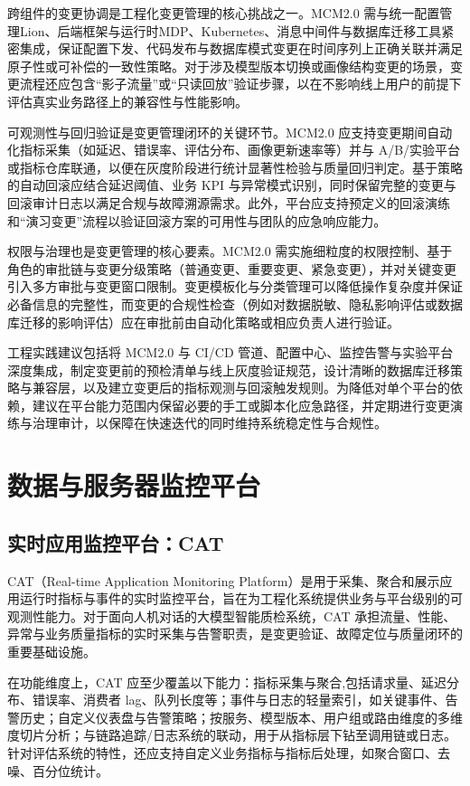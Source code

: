 跨组件的变更协调是工程化变更管理的核心挑战之一。MCM2.0 需与统一配置管理Lion、后端框架与运行时MDP、Kubernetes、消息中间件与数据库迁移工具紧密集成，保证配置下发、代码发布与数据库模式变更在时间序列上正确关联并满足原子性或可补偿的一致性策略。对于涉及模型版本切换或画像结构变更的场景，变更流程还应包含“影子流量”或“只读回放”验证步骤，以在不影响线上用户的前提下评估真实业务路径上的兼容性与性能影响。

可观测性与回归验证是变更管理闭环的关键环节。MCM2.0 应支持变更期间自动化指标采集（如延迟、错误率、评估分布、画像更新速率等）并与 A/B/实验平台或指标仓库联通，以便在灰度阶段进行统计显著性检验与质量回归判定。基于策略的自动回滚应结合延迟阈值、业务 KPI 与异常模式识别，同时保留完整的变更与回滚审计日志以满足合规与故障溯源需求。此外，平台应支持预定义的回滚演练和“演习变更”流程以验证回滚方案的可用性与团队的应急响应能力。

权限与治理也是变更管理的核心要素。MCM2.0 需实施细粒度的权限控制、基于角色的审批链与变更分级策略（普通变更、重要变更、紧急变更），并对关键变更引入多方审批与变更窗口限制。变更模板化与分类管理可以降低操作复杂度并保证必备信息的完整性，而变更的合规性检查（例如对数据脱敏、隐私影响评估或数据库迁移的影响评估）应在审批前由自动化策略或相应负责人进行验证。

工程实践建议包括将 MCM2.0 与 CI/CD 管道、配置中心、监控告警与实验平台深度集成，制定变更前的预检清单与线上灰度验证规范，设计清晰的数据库迁移策略与兼容层，以及建立变更后的指标观测与回滚触发规则。为降低对单个平台的依赖，建议在平台能力范围内保留必要的手工或脚本化应急路径，并定期进行变更演练与治理审计，以保障在快速迭代的同时维持系统稳定性与合规性。
\section{数据与服务器监控平台}

\subsection{实时应用监控平台：CAT}
CAT（Real-time Application Monitoring Platform）是用于采集、聚合和展示应用运行时指标与事件的实时监控平台，旨在为工程化系统提供业务与平台级别的可观测性能力。对于面向人机对话的大模型智能质检系统，CAT 承担流量、性能、异常与业务质量指标的实时采集与告警职责，是变更验证、故障定位与质量闭环的重要基础设施。

在功能维度上，CAT 应至少覆盖以下能力：指标采集与聚合,包括请求量、延迟分布、错误率、消费者 lag、队列长度等；事件与日志的轻量索引，如关键事件、告警历史；自定义仪表盘与告警策略；按服务、模型版本、用户组或路由维度的多维度切片分析；与链路追踪/日志系统的联动，用于从指标层下钻至调用链或日志\cite{anand2020aggregatedriventracevisualizationsperformance}。针对评估系统的特性，还应支持自定义业务指标与指标后处理，如聚合窗口、去噪、百分位统计。

